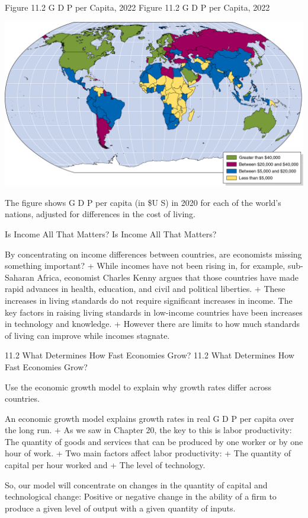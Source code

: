 \documentclass[
  12pt,
  ignorenonframetext,
]{beamer}
\begin{document}
\begin{frame}{Figure 11.2 G D P per Capita, 2022}
\protect\hypertarget{figure-11.2-g-d-p-per-capita-2022}{}
Figure 11.2 G D P per Capita, 2022

\includegraphics[width=\textwidth,height=0.99\textheight]{imgs3/img_slide14a.png}

The figure shows G D P per capita (in \$U S) in 2020 for each of the
world's nations, adjusted for differences in the cost of living.
\end{frame}

\begin{frame}{Is Income All That Matters?}
\protect\hypertarget{is-income-all-that-matters}{}
Is Income All That Matters?

By concentrating on income differences between countries, are economists
missing something important? + While incomes have not been rising in,
for example, sub-Saharan Africa, economist Charles Kenny argues that
those countries have made rapid advances in health, education, and civil
and political liberties. + These increases in living standards do not
require significant increases in income. The key factors in raising
living standards in low-income countries have been increases in
technology and knowledge. + However there are limits to how much
standards of living can improve while incomes stagnate.
\end{frame}

\begin{frame}{11.2 What Determines How Fast Economies Grow?}
\protect\hypertarget{what-determines-how-fast-economies-grow}{}
11.2 What Determines How Fast Economies Grow?

Use the economic growth model to explain why growth rates differ across
countries.

An economic growth model explains growth rates in real G D P per capita
over the long run. + As we saw in Chapter 20, the key to this is labor
productivity: The quantity of goods and services that can be produced by
one worker or by one hour of work. + Two main factors affect labor
productivity: + The quantity of capital per hour worked and + The level
of technology.

So, our model will concentrate on changes in the quantity of capital and
technological change: Positive or negative change in the ability of a
firm to produce a given level of output with a given quantity of inputs.
\end{frame}
\end{document}
